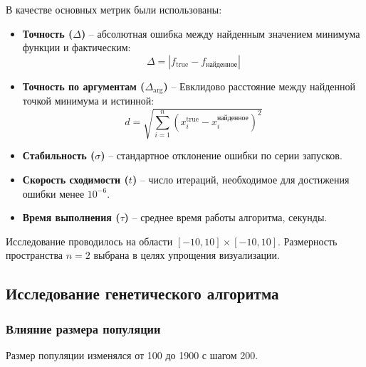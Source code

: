 \documentclass[12pt,a4paper]{article}
\begin{document}
В качестве основных метрик были использованы:
\begin{itemize}
    \item \textbf{Точность (\(\Delta\))} -- абсолютная ошибка между найденным значением минимума функции и фактическим:
    \[
    \Delta = \left| f_{\text{true}} - f_{\text{найденное}} \right|
    \]
    \item \textbf{Точность по аргументам (\(\Delta_{\arg}\))} -- Евклидово расстояние между найденной точкой минимума и истинной:
    \[
    d = \sqrt{\sum_{i=1}^{n} (x_i^{\text{true}} - x_i^{\text{найденное}})^2}
    \]
    \item \textbf{Стабильность (\(\sigma\))} -- стандартное отклонение ошибки по серии запусков.
    \item \textbf{Скорость сходимости (\(t\))} -- число итераций, необходимое для достижения ошибки менее \(10^{-6}\).
    \item \textbf{Время выполнения (\(\tau\))} -- среднее время работы алгоритма, секунды.
\end{itemize}

Исследование проводилось на области \([-10, 10] \times [-10, 10]\). Размерность пространства \(n = 2\) выбрана в целях упрощения визуализации.

\subsection{Исследование генетического алгоритма}

\subsubsection{Влияние размера популяции}
Размер популяции изменялся от 100 до 1900 с шагом 200.
\end{document}
